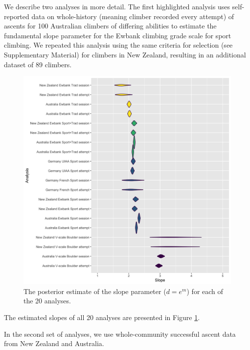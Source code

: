 \documentclass{article}
\begin{document}
{\afterpage{%
    \clearpage%
    \thispagestyle{empty}%
    \begin{landscape}%
       
    \end{landscape}
    \clearpage%
}


We describe two analyses in more detail. The first highlighted analysis uses self-reported data on whole-history (meaning climber recorded every attempt) of ascents for 100 Australian climbers of differing abilities to estimate the fundamental slope parameter for the Ewbank climbing grade scale for sport climbing. We repeated this analysis using the same criteria for selection (see Supplementary Material) for climbers in New Zealand, resulting in an additional dataset of 89 climbers. 


\begin{figure}
\centering
\includegraphics[width=\textwidth]{../R/final-plot.png}
\caption{\small The posterior estimate of the slope parameter ($d=e^m$) for each of the 20 analyses.}
\label{finalplot}
\end{figure}

The estimated slopes of all 20 analyses are presented in Figure \ref{finalplot}.

In the second set of analyses, we use whole-community successful ascent data from New Zealand and Australia. 

}
\end{document}
